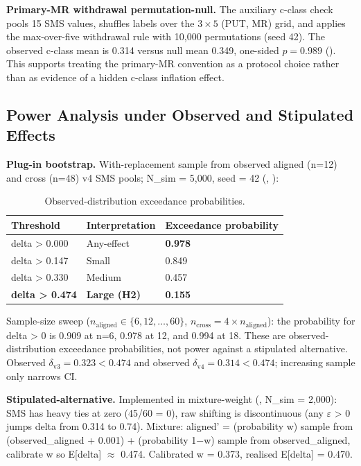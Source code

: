 \documentclass[manuscript,screen,review]{acmart}
\begin{document}
\textbf{Primary-MR withdrawal permutation-null.} The auxiliary c-class
check pools 15 SMS values, shuffles labels over the $3 \times 5$ (PUT,
MR) grid, and applies the max-over-five withdrawal rule with 10,000
permutations (seed 42). The observed c-class mean is 0.314 versus null
mean 0.349, one-sided $p = 0.989$
(). This supports treating
the primary-MR convention as a protocol choice rather than as evidence of
a hidden c-class inflation effect.

\subsection{Power Analysis under Observed and Stipulated Effects}\label{d.3-power-analysis-plug-in-and-stipulated-alternative}

\textbf{Plug-in bootstrap.} With-replacement sample from observed
aligned (n=12) and cross (n=48) v4 SMS pools; N\_sim = 5,000, seed = 42
(, ):

{%
\begin{longtable}[]{@{}lll@{}}
\caption{Observed-distribution exceedance probabilities.}\label{tab:p2-23}\\
\toprule\noalign{}
Threshold & Interpretation & Exceedance probability \\
\midrule\noalign{}
\endfirsthead
\endhead
\bottomrule\noalign{}
\endlastfoot
delta \textgreater{} 0.000 & Any-effect & \textbf{0.978} \\
delta \textgreater{} 0.147 & Small & 0.849 \\
delta \textgreater{} 0.330 & Medium & 0.457 \\
\textbf{delta \textgreater{} 0.474} & \textbf{Large (H2)} &
\textbf{0.155} \\
\end{longtable}
}

Sample-size sweep ($n_{\mathrm{aligned}} \in \{6, 12, \ldots, 60\}$, $n_{\mathrm{cross}} = 4 \times n_{\mathrm{aligned}}$):
the probability for delta \textgreater{} 0 is 0.909 at n=6, 0.978 at
12, and 0.994 at 18. These are observed-distribution exceedance
probabilities, not power against a stipulated alternative. Observed
$\delta_{\mathrm{v3}} = 0.323 < 0.474$ and observed
$\delta_{\mathrm{v4}} = 0.314 < 0.474$; increasing sample only narrows CI.

\textbf{Stipulated-alternative.} Implemented in
mixture-weight (,
N\_sim = 2,000): SMS has heavy ties at zero (45/60 = 0), raw shifting is
discontinuous (any $\varepsilon$ \textgreater{} 0 jumps delta from 0.314 to 0.74).
Mixture: aligned' = (probability w) sample from (observed\_aligned +
0.001) + (probability 1$-$w) sample from observed\_aligned, calibrate w so
E{[}delta{]} $\approx$ 0.474. Calibrated w = 0.373, realised E{[}delta{]} =
0.470.
\end{document}
